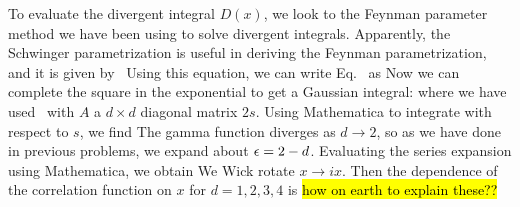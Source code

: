 \documentclass[11pt]{article}
\begin{document}
{	To evaluate the divergent integral $D(x)$, we look to the Feynman parameter method we have been using to solve divergent integrals.  Apparently, the Schwinger parametrization is useful in deriving the Feynman parametrization, and it is given by~\cite{Feynman}
	Using this equation, we can write Eq.~ as
	Now we can complete the square in the exponential to get a Gaussian integral:
	where we have used~\cite{QFT}
	with $A$ a $d \times d$ diagonal matrix $2s$.  Using Mathematica to integrate with respect to $s$, we find
	The gamma function diverges as $d \to 2$, so as we have done in previous problems, we expand about $\epsilon = 2 - d$.  Evaluating the series expansion using Mathematica, we obtain
	We Wick rotate $x \to i x$.  Then the dependence of the correlation function on $x$ for $d = 1, 2, 3, 4$ is
	\hl{how on earth to explain these??}
%
%
}
\end{document}
